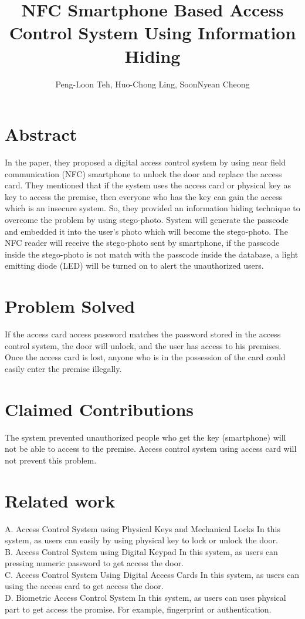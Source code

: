 \documentclass[•]{article}
\title{NFC Smartphone Based Access Control System Using Information Hiding}
\author{Peng-Loon Teh, Huo-Chong Ling, SoonNyean Cheong}
\date{}
\begin{document}

\tableofcontents
\maketitle

\section{Abstract}
\hspace{1cm}In the paper, they proposed a digital access control system by using near field communication (NFC) smartphone to unlock the door and replace the access card. They mentioned that if the system uses the access card or physical key as key to access the premise, then everyone who has the key can gain the access which is an insecure system. So, they provided an information hiding technique to overcome the problem by using stego-photo. System will generate the passcode and embedded it into the user’s photo which will become the stego-photo. The NFC reader will receive the stego-photo sent by smartphone, if the passcode inside the stego-photo is not match with the passcode inside the database, a light emitting diode (LED) will be turned on to alert the unauthorized users. ~\cite{Katzenbeisser2000}

\section{Problem Solved}
If the access card access password matches the password stored in the access control system, the door will unlock, and the user has access to his premises.
Once the access card is lost, anyone who is in the possession of the card could easily enter the premise illegally.

\section{Claimed Contributions}
The system prevented unauthorized people who get the key (smartphone) will not be able to access to the premise. Access control system using access card will not prevent this problem.
\section{Related work}
A.	Access Control System using Physical Keys and Mechanical Locks
In this system, as users can easily by using physical key to lock or unlock the door.\\
B.	Access Control System using Digital Keypad
In this system, as users can pressing numeric password to get access the door.\\
C.	Access Control System Using Digital Access Cards
In this system, as users can using the access card to get access the door.\\
D.	Biometric Access Control System
In this system, as users can uses physical part to get access the promise. For example, fingerprint or authentication.
\end{document}

